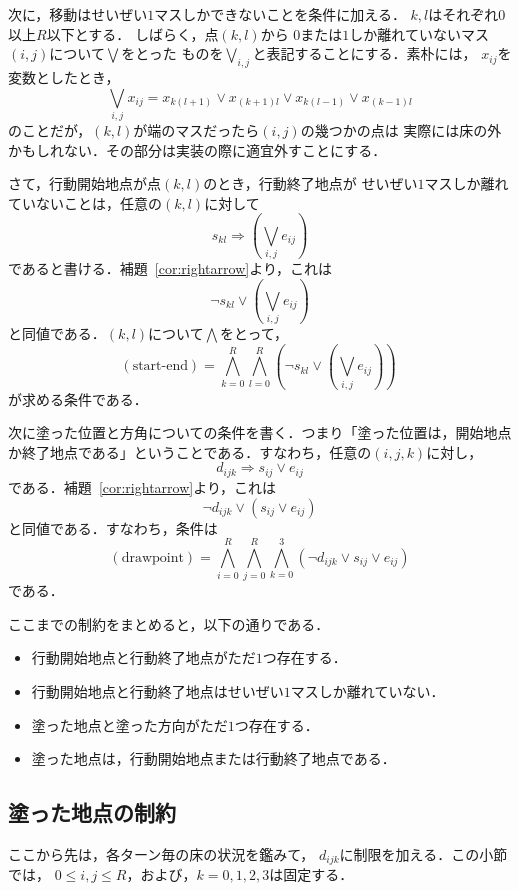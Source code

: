 次に，移動はせいぜい$1$マスしかできないことを条件に加える．
$k, l$はそれぞれ$0$以上$R$以下とする．
しばらく，点$(k, l)$から
$0$または$1$しか離れていないマス$(i, j)$について$\bigvee$をとった
ものを$\bigvee_{i, j}$と表記することにする．素朴には，
$x_{ij}$を変数としたとき，
\[
 \bigvee_{i, j} x_{ij} = x_{k(l+1)} \lor x_{(k+1)l} \lor
 x_{k(l-1)} \lor x_{(k-1)l}
\]
のことだが，$(k, l)$が端のマスだったら$(i, j)$の幾つかの点は
実際には床の外かもしれない．その部分は実装の際に適宜外すことにする．

さて，行動開始地点が点$(k, l)$のとき，行動終了地点が
せいぜい$1$マスしか離れていないことは，任意の$(k, l)$に対して
\[
 s_{kl} \Rightarrow \left( \bigvee_{i, j} e_{ij} \right)
\]
であると書ける．補題~\ref{cor:rightarrow}より，これは
\[
 \lnot s_{kl} \lor \left( \bigvee_{i, j} e_{ij} \right)
\]
と同値である．$(k, l)$について$\bigwedge$をとって，
\[
 (\text{start-end}) = \bigwedge_{k = 0}^R \bigwedge_{l = 0}^R 
 \left(\lnot s_{kl} \lor \left( \bigvee_{i, j} e_{ij} \right) \right)\
\]
が求める条件である．

次に塗った位置と方角についての条件を書く．つまり「塗った位置は，開始地点
か終了地点である」ということである．すなわち，任意の$(i, j, k)$に対し，
\[
 d_{ijk} \Longrightarrow s_{ij} \lor e_{ij}
\]
である．補題~\ref{cor:rightarrow}より，これは
\[
 \lnot d_{ijk} \lor (s_{ij} \lor e_{ij})
\]
と同値である．すなわち，条件は
\[
 (\text{drawpoint}) =
 \bigwedge_{i = 0}^{R} \bigwedge_{j = 0}^R \bigwedge_{k = 0}^3
 (\lnot d_{ijk} \lor s_{ij} \lor e_{ij})
\]
である．

\begin{rem}
 ここまでの制約をまとめると，以下の通りである．
 \begin{itemize}
  \item 行動開始地点と行動終了地点がただ$1$つ存在する．
  \item 行動開始地点と行動終了地点はせいぜい$1$マスしか離れていない．
  \item 塗った地点と塗った方向がただ$1$つ存在する．
  \item 塗った地点は，行動開始地点または行動終了地点である．
 \end{itemize}
\end{rem}

\subsection{塗った地点の制約}

ここから先は，各ターン毎の床の状況を鑑みて，
$d_{ijk}$に制限を加える．この小節では，
$0 \leq i, j \leq R$，および，$k = 0, 1, 2, 3$は固定する．

